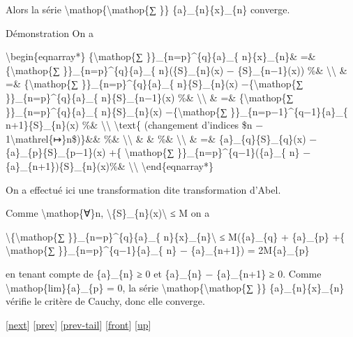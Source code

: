\documentclass[]{article}
\begin{document}
Alors la série \textbackslash{}mathop\{\textbackslash{}mathop\{∑ \}\}
\{a\}\_\{n\}\{x\}\_\{n\} converge.

Démonstration On a

\textbackslash{}begin\{eqnarray*\} \{\textbackslash{}mathop\{∑
\}\}\_\{n=p\}\^{}\{q\}\{a\}\_\{ n\}\{x\}\_\{n\}\& =\&
\{\textbackslash{}mathop\{∑ \}\}\_\{n=p\}\^{}\{q\}\{a\}\_\{
n\}(\{S\}\_\{n\}(x) − \{S\}\_\{n−1\}(x)) \%\&
\textbackslash{}\textbackslash{} \& =\& \{\textbackslash{}mathop\{∑
\}\}\_\{n=p\}\^{}\{q\}\{a\}\_\{ n\}\{S\}\_\{n\}(x)
−\{\textbackslash{}mathop\{∑ \}\}\_\{n=p\}\^{}\{q\}\{a\}\_\{
n\}\{S\}\_\{n−1\}(x) \%\& \textbackslash{}\textbackslash{} \& =\&
\{\textbackslash{}mathop\{∑ \}\}\_\{n=p\}\^{}\{q\}\{a\}\_\{
n\}\{S\}\_\{n\}(x) −\{\textbackslash{}mathop\{∑
\}\}\_\{n=p−1\}\^{}\{q−1\}\{a\}\_\{ n+1\}\{S\}\_\{n\}(x) \%\&
\textbackslash{}\textbackslash{} \textbackslash{}text\{ (changement
d'indices \$n − 1\textbackslash{}mathrel\{↦\}n\$)\}\&\& \%\&
\textbackslash{}\textbackslash{} \& \& \%\&
\textbackslash{}\textbackslash{} \& =\& \{a\}\_\{q\}\{S\}\_\{q\}(x) −
\{a\}\_\{p\}\{S\}\_\{p−1\}(x) +\{ \textbackslash{}mathop\{∑
\}\}\_\{n=p\}\^{}\{q−1\}(\{a\}\_\{ n\} −
\{a\}\_\{n+1\})\{S\}\_\{n\}(x)\%\& \textbackslash{}\textbackslash{}
\textbackslash{}end\{eqnarray*\}

On a effectué ici une transformation dite transformation d'Abel.

Comme \textbackslash{}mathop\{∀\}n,
\textbackslash{}\textbar{}\{S\}\_\{n\}(x)\textbackslash{}\textbar{} ≤ M
on a

\textbackslash{}\textbar{}\{\textbackslash{}mathop\{∑
\}\}\_\{n=p\}\^{}\{q\}\{a\}\_\{
n\}\{x\}\_\{n\}\textbackslash{}\textbar{} ≤
M(\textbar{}\{a\}\_\{q\}\textbar{} + \textbar{}\{a\}\_\{p\}\textbar{}
+\{ \textbackslash{}mathop\{∑
\}\}\_\{n=p\}\^{}\{q−1\}\textbar{}\{a\}\_\{ n\} −
\{a\}\_\{n+1\}\textbar{}) = 2M\{a\}\_\{p\}

en tenant compte de \{a\}\_\{n\} ≥ 0 et \{a\}\_\{n\} − \{a\}\_\{n+1\} ≥
0. Comme \textbackslash{}mathop\{lim\}\{a\}\_\{p\} = 0, la série
\textbackslash{}mathop\{\textbackslash{}mathop\{∑ \}\}
\{a\}\_\{n\}\{x\}\_\{n\} vérifie le critère de Cauchy, donc elle
converge.

{[}\href{coursse40.html}{next}{]} {[}\href{coursse38.html}{prev}{]}
{[}\href{coursse38.html\#tailcoursse38.html}{prev-tail}{]}
{[}\href{coursse39.html}{front}{]}
{[}\href{coursch8.html\#coursse39.html}{up}{]}
\end{document}
